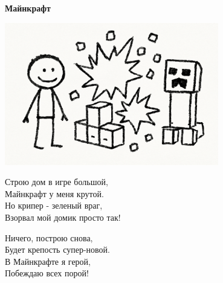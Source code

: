 \vspace*{\fill}
\begin{center}
  {\huge\textbf{Майнкрафт}}

  \vspace{1.5em}  \includegraphics[width=0.7\textwidth]{pictures/minecraft.png}
  \vspace{4em}
  \parbox{0.6\textwidth}{
    \LARGE
    \begin{spacing}{1.2}
      Строю дом в игре большой,\\
      Майнкрафт у меня крутой.\\
      Но крипер - зеленый враг,\\
      Взорвал мой домик просто так!\\

      \vspace{1em}

      Ничего, построю снова,\\
      Будет крепость супер-новой.\\
      В Майнкрафте я герой,\\
      Побеждаю всех порой! %
    \end{spacing}
      
  }
\end{center}
\vspace*{\fill}